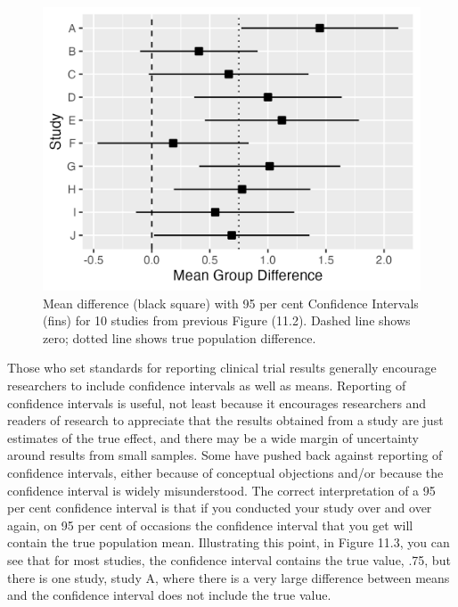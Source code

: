 \documentclass{krantz}
\begin{document}
\begin{center}
\begin{figure}
\includegraphics[width=0.75\linewidth]{images_bw/carbo10CI} \caption{Mean difference (black square) with 95 per cent Confidence Intervals (fins) for 10 studies from previous Figure (11.2). Dashed line shows zero; dotted line shows true population difference.}\label{fig:ciplot}
\end{figure}
\end{center}

\begin{tcolorbox}[colback=Black!5!lightgray,colframe=black!75!black,coltitle=white,title=Reporting of Confidence Intervals]\label{box:confint}
Those who set standards for reporting clinical trial results generally encourage researchers to include confidence intervals as well as means. Reporting of confidence intervals is useful, not least because it encourages researchers and readers of research to appreciate that the results obtained from a study are just estimates of the true effect, and there may be a wide margin of uncertainty around results from small samples.  Some have pushed back against reporting of confidence intervals, either because of conceptual objections and/or because the confidence interval is widely misunderstood. The correct interpretation of a 95 per cent confidence interval is that if you conducted your study over and over again, on 95 per cent of occasions the confidence interval that you get will contain the true population mean. Illustrating this point, in Figure 11.3, you can see that for most studies, the confidence interval contains the true value, .75, but there is one study, study A, where there is a very large difference between means and the confidence interval does not include the true value. 
\end{tcolorbox}
\end{document}
